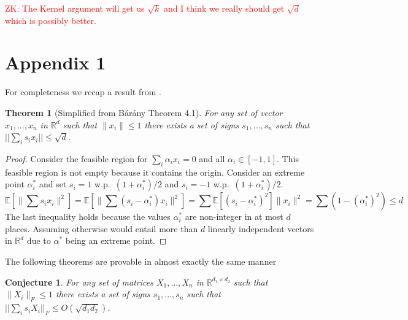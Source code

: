 \documentclass{article} %
\newtheorem{theorem}{Theorem}[section]
\newtheorem{conjecture}{Conjecture}[section]
\newcommand{\zk}[1]{\textcolor{red}{ZK: #1}}
\newcommand{\R}{\mathbb{R}}
\newcommand{\E}{\mathbb{E}}
\newcommand{\eps}{\epsilon}
\begin{document}
\zk{The Kernel argument will get us $\sqrt{k}$ and I think we really should get $\sqrt{d}$ which is possibly better.}
%
%
%
%



\section{Appendix 1}
For completeness we recap a result from \cite{barany2008}.
\begin{theorem}[Simplified from B\'ar\'any \cite{barany2008} Theorem 4.1]
For any set of vector $x_1,...,x_n$ in $\R^d$ such that $\|x_i\| \le 1$ there exists a set of signs $s_1,...,s_n$ such that $||\sum_i s_i x_i || \le \sqrt{d}$.
\end{theorem}
\begin{proof}
Consider the feasible region for $\sum_i \alpha_i x_i = 0$ and all $\alpha_i \in [-1,1]$.
This feasible region is not empty because it contains the origin. 
Consider an extreme point $\alpha^*_i$ and set $s_i = 1$ w.p.\ $(1+\alpha^*_i)/2$ and $s_i = -1$ w.p.\ $(1+\alpha^*_i)/2$.
$$
\E[\|\sum s_i x_i\|^2] =  \E[\|\sum (s_i - \alpha^*_i) x_i\|^2] = \sum \E[(s_i - \alpha^*_i)^2] \|x_i\|^2= \sum (1-(\alpha_i^*)^2) \le d
$$
The last inequality holds because the values $\alpha^*_i$ are non-integer in at most $d$ places. 
Assuming otherwise would entail more than $d$ linearly independent vectors in $\R^d$ due to $\alpha^*$ being an extreme point.
\end{proof}

\noindent The following theorems are provable in almost exactly the same manner
\begin{conjecture}
For any set of matrices $X_1,...,X_n$ in $\R^{d_1 \times d_2}$ such that $\|X_i\|_{F} \le 1$ there exists a set of signs $s_1,...,s_n$ such that $||\sum_i s_i X_i||_{F} \le O(\sqrt{d_1d_2})$.
\end{conjecture}
\end{document}
